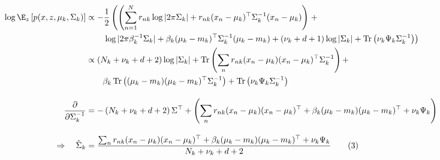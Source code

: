 \documentclass[11pt]{article}
\DeclareMathOperator{\Trace}{Tr}
\def\Tr{^\top}
\begin{document}
\begin{align*}
\log \E_z \left[ p(x, z, \mu_k, \Sigma_k)\right] & \propto  -\frac{1}{2}\left(\left(\sum_{n=1}^N r_{nk}\log|2\pi\Sigma_k| + r_{nk}(x_n - \mu_k)\Tr\Sigma_k^{-1}(x_n - \mu_k) \right) \right.+\\
& \left. \qquad  \log|2\pi\beta_k^{-1}\Sigma_k| +  \beta_k(\mu_k - m_k)\Tr\Sigma_k^{-1}(\mu_k - m_k) + (\nu_k + d + 1)\log|\Sigma_k| + \Trace\left(\nu_k\Psi_k\Sigma_k^{-1}\right)
\right)\\
& \propto \left(N_k + \nu_k + d + 2\right) \log|\Sigma_k| + \Trace\left(\sum_n r_{nk} (x_n - \mu_k)(x_n-\mu_k)\Tr \Sigma_k^{-1}\right) +\\
& \qquad  \beta_k\Trace\left((\mu_k - m_k)(\mu_k - m_k)\Tr\Sigma_k^{-1}\right) + \Trace\left(\nu_k\Psi_k\Sigma_k^{-1}\right)\\[10pt]
\frac{\partial}{\partial \Sigma_k^{-1}} & = -\left(N_k + \nu_k + d + 2\right)\Sigma\Tr + \left(\sum_n r_{nk} (x_n - \mu_k)(x_n-\mu_k)\Tr + \beta_k(\mu_k - m_k)(\mu_k - m_k)\Tr + \nu_k\Psi_k\right)\\[10pt]
\Rightarrow \quad \hat\Sigma_k &=\frac{\sum_n r_{nk} (x_n - \mu_k)(x_n-\mu_k)\Tr + \beta_k(\mu_k - m_k)(\mu_k - m_k)\Tr + \nu_k\Psi_k}{N_k + \nu_k + d + 2} \tag{3}\label{est_sigma}
\end{align*}
\end{document}
